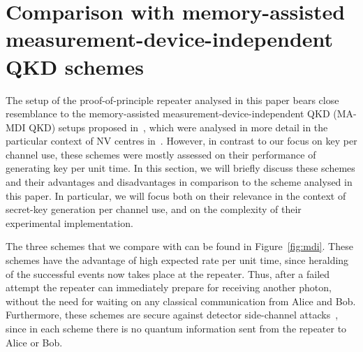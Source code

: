 \documentclass[aps,pra,reprint,superscriptaddress]{revtex4-1}
\begin{document}
\section{Comparison with memory-assisted measurement-device-independent QKD schemes}
\label{sec:MDI}

The setup of the proof-of-principle repeater analysed in this paper bears close resemblance to the memory-assisted measurement-device-independent QKD (MA-MDI QKD) setups proposed in~\cite{panayi2014memory}, which were analysed in more detail in the particular context of NV centres in~\cite{piparo2017measurement}. However, in contrast to our focus on key per channel use, these schemes were mostly assessed on their performance of generating key per unit time. In this section, we will briefly discuss these schemes and their advantages and disadvantages in comparison to the scheme analysed in this paper. In particular, we will focus both on their relevance in the context of secret-key generation per channel use, and on the complexity of their experimental implementation.



The three schemes that we compare with can be found in Figure~\ref{fig:mdi}. These schemes have the advantage of high expected rate per unit time, since heralding of the successful events now takes place at the repeater. Thus, after a failed attempt the repeater can immediately prepare for receiving another photon, without the need for waiting on any classical communication from Alice and Bob. Furthermore, these schemes are secure against detector side-channel attacks~\cite{lo2012measurement}, since in each scheme there is no quantum information sent from the repeater to Alice or Bob.
\end{document}
